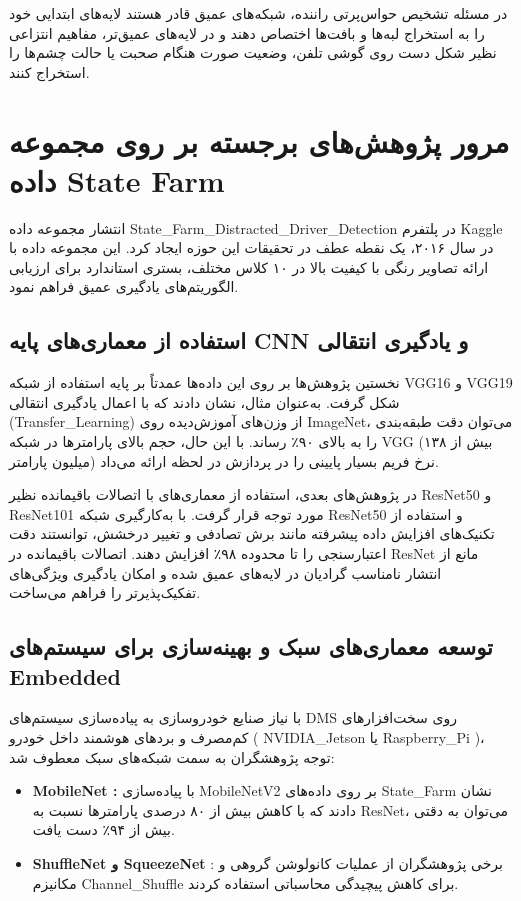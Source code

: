 \documentclass{report}
\begin{document}
 	در مسئله تشخیص حواس‌پرتی راننده، شبکه‌های عمیق قادر هستند لایه‌های ابتدایی خود را به استخراج لبه‌ها و بافت‌ها اختصاص دهند و در لایه‌های عمیق‌تر، مفاهیم انتزاعی نظیر شکل دست روی گوشی تلفن، وضعیت صورت هنگام صحبت یا حالت چشم‌ها را استخراج کنند.
 	
 	\section{مرور پژوهش‌های برجسته بر روی مجموعه داده State Farm}
 	انتشار مجموعه داده State\_Farm\_Distracted\_Driver\_Detection در پلتفرم Kaggle در سال ۲۰۱۶، یک نقطه عطف در تحقیقات این حوزه ایجاد کرد. این مجموعه داده با ارائه تصاویر رنگی با کیفیت بالا در ۱۰ کلاس مختلف، بستری استاندارد برای ارزیابی الگوریتم‌های یادگیری عمیق فراهم نمود.
 	
 	\subsection{استفاده از معماری‌های پایه CNN و یادگیری انتقالی}
 	نخستین پژوهش‌ها بر روی این داده‌ها عمدتاً بر پایه استفاده از شبکه VGG16 و VGG19 شکل گرفت. به‌عنوان مثال،  نشان دادند که با اعمال یادگیری انتقالی (Transfer\_Learning) از وزن‌های آموزش‌دیده روی ImageNet، می‌توان دقت طبقه‌بندی را به بالای ۹۰٪ رساند. با این حال، حجم بالای پارامترها در شبکه VGG (بیش از ۱۳۸ میلیون پارامتر) نرخ فریم بسیار پایینی را در پردازش در لحظه ارائه می‌داد.
 	
 	در پژوهش‌های بعدی، استفاده از معماری‌های با اتصالات باقیمانده نظیر ResNet50 و ResNet101 مورد توجه قرار گرفت.  با به‌کارگیری شبکه ResNet50 و استفاده از تکنیک‌های افزایش داده پیشرفته مانند برش تصادفی و تغییر درخشش، توانستند دقت اعتبارسنجی را تا محدوده ۹۸٪ افزایش دهند. اتصالات باقیمانده در ResNet مانع از انتشار نامناسب گرادیان در لایه‌های عمیق شده و امکان یادگیری ویژگی‌های تفکیک‌پذیرتر را فراهم می‌ساخت.
 	
 	\subsection{توسعه معماری‌های سبک و بهینه‌سازی برای سیستم‌های Embedded}
 	با نیاز صنایع خودروسازی به پیاده‌سازی سیستم‌های DMS روی سخت‌افزارهای کم‌مصرف و برد‌های هوشمند داخل خودرو ( NVIDIA\_Jetson یا Raspberry\_Pi )، توجه پژوهشگران به سمت شبکه‌های سبک معطوف شد:
 	\begin{itemize}
 		\item \textbf{MobileNet :}  با پیاده‌سازی MobileNetV2 بر روی داده‌های State\_Farm نشان دادند که با کاهش بیش از ۸۰ درصدی پارامترها نسبت به ResNet، می‌توان به دقتی بیش از ۹۴٪ دست یافت.
 		\item \textbf{ShuffleNet و SqueezeNet} : برخی پژوهشگران از عملیات کانولوشن گروهی و مکانیزم Channel\_Shuffle برای کاهش پیچیدگی محاسباتی استفاده کردند.
 	\end{itemize}
 	
\end{document}
